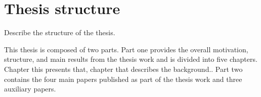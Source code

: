 \section{Thesis structure}
\label{sec:thesisstruct}

Describe the structure of the thesis.

This thesis is composed of two parts. Part one provides the overall motivation, structure, and main results from the thesis work and is divided into five
chapters. Chapter this presents that, chapter that describes the background.. Part two contains the four main papers published as part of the thesis work and
three auxiliary papers.


